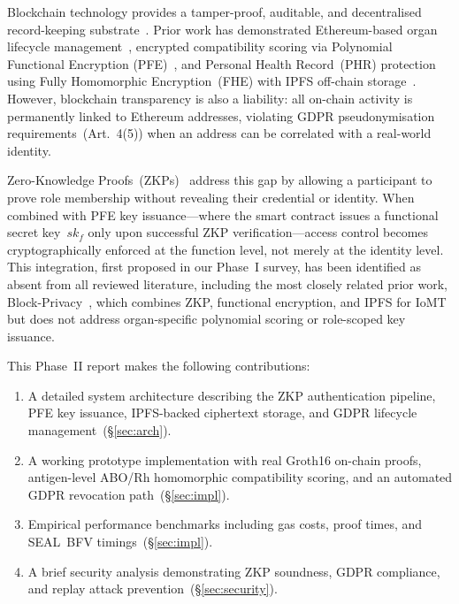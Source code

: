 \documentclass[10pt,twocolumn,a4paper]{article}
\begin{document}
Blockchain technology provides a tamper-proof, auditable, and decentralised
record-keeping substrate~\cite{hawashin2022,mewada2026}. Prior work has demonstrated
Ethereum-based organ lifecycle management~\cite{hawashin2022}, encrypted compatibility
scoring via Polynomial Functional Encryption (PFE)~\cite{samsukha2025}, and
Personal Health Record~(PHR) protection using Fully Homomorphic Encryption~(FHE) with
IPFS off-chain storage~\cite{vanin2023}. However, blockchain transparency is also
a liability: all on-chain activity is permanently linked to Ethereum addresses,
violating GDPR pseudonymisation requirements~(Art.~4(5)) when an address can be
correlated with a real-world identity.

Zero-Knowledge Proofs~(ZKPs)~\cite{goldwasser1989,ranaweera2023} address this gap by
allowing a participant to prove role membership without revealing their credential or
identity. When combined with PFE key issuance---where the smart contract issues a
functional secret key~$sk_f$ only upon successful ZKP verification---access control
becomes cryptographically enforced at the function level, not merely at the identity
level. This integration, first proposed in our Phase~I survey, has been identified as
absent from all reviewed literature, including the most closely related prior work,
Block-Privacy~\cite{egala2023}, which combines ZKP, functional encryption, and IPFS
for IoMT but does not address organ-specific polynomial scoring or role-scoped key
issuance.

This Phase~II report makes the following contributions:
\begin{enumerate}[leftmargin=*, nosep]
  \item A detailed system architecture describing the ZKP authentication pipeline,
        PFE key issuance, IPFS-backed ciphertext storage, and GDPR lifecycle
        management~(\S\ref{sec:arch}).
  \item A working prototype implementation with real Groth16 on-chain proofs,
        antigen-level ABO/Rh homomorphic compatibility scoring, and an automated
        GDPR revocation path~(\S\ref{sec:impl}).
  \item Empirical performance benchmarks including gas costs, proof times, and
        SEAL~BFV timings~(\S\ref{sec:impl}).
  \item A brief security analysis demonstrating ZKP soundness, GDPR compliance,
        and replay attack prevention~(\S\ref{sec:security}).
\end{enumerate}
\end{document}

